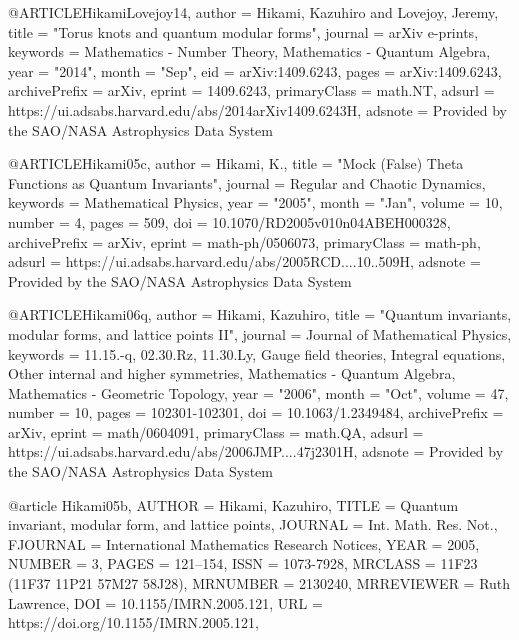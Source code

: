 @ARTICLE{HikamiLovejoy14,
       author = {{Hikami}, Kazuhiro and {Lovejoy}, Jeremy},
        title = "{Torus knots and quantum modular forms}",
      journal = {arXiv e-prints},
     keywords = {Mathematics - Number Theory, Mathematics - Quantum Algebra},
         year = "2014",
        month = "Sep",
          eid = {arXiv:1409.6243},
        pages = {arXiv:1409.6243},
archivePrefix = {arXiv},
       eprint = {1409.6243},
 primaryClass = {math.NT},
       adsurl = {https://ui.adsabs.harvard.edu/abs/2014arXiv1409.6243H},
      adsnote = {Provided by the SAO/NASA Astrophysics Data System}
}

@ARTICLE{Hikami05c,
       author = {{Hikami}, K.},
        title = "{Mock (False) Theta Functions as Quantum Invariants}",
      journal = {Regular and Chaotic Dynamics},
     keywords = {Mathematical Physics},
         year = "2005",
        month = "Jan",
       volume = {10},
       number = {4},
        pages = {509},
          doi = {10.1070/RD2005v010n04ABEH000328},
archivePrefix = {arXiv},
       eprint = {math-ph/0506073},
 primaryClass = {math-ph},
       adsurl = {https://ui.adsabs.harvard.edu/abs/2005RCD....10..509H},
      adsnote = {Provided by the SAO/NASA Astrophysics Data System}
}

@ARTICLE{Hikami06q,
       author = {{Hikami}, Kazuhiro},
        title = "{Quantum invariants, modular forms, and lattice points II}",
      journal = {Journal of Mathematical Physics},
     keywords = {11.15.-q, 02.30.Rz, 11.30.Ly, Gauge field theories, Integral equations, Other internal and higher symmetries, Mathematics - Quantum Algebra, Mathematics - Geometric Topology},
         year = "2006",
        month = "Oct",
       volume = {47},
       number = {10},
        pages = {102301-102301},
          doi = {10.1063/1.2349484},
archivePrefix = {arXiv},
       eprint = {math/0604091},
 primaryClass = {math.QA},
       adsurl = {https://ui.adsabs.harvard.edu/abs/2006JMP....47j2301H},
      adsnote = {Provided by the SAO/NASA Astrophysics Data System}
}



@article {Hikami05b,
    AUTHOR = {Hikami, Kazuhiro},
     TITLE = {Quantum invariant, modular form, and lattice points},
   JOURNAL = {Int. Math. Res. Not.},
  FJOURNAL = {International Mathematics Research Notices},
      YEAR = {2005},
    NUMBER = {3},
     PAGES = {121--154},
      ISSN = {1073-7928},
   MRCLASS = {11F23 (11F37 11P21 57M27 58J28)},
  MRNUMBER = {2130240},
MRREVIEWER = {Ruth Lawrence},
       DOI = {10.1155/IMRN.2005.121},
       URL = {https://doi.org/10.1155/IMRN.2005.121},
}

